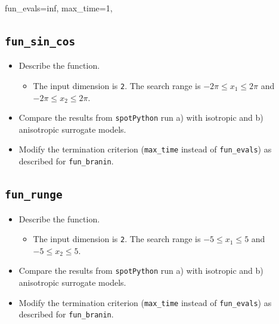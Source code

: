 \documentclass[
  letterpaper,
  DIV=11,
  numbers=noendperiod]{scrreprt}
\newenvironment{Shaded}{\begin{snugshade}}{\end{snugshade}}
\newcommand{\DecValTok}[1]{\textcolor[rgb]{0.68,0.00,0.00}{#1}}
\newcommand{\NormalTok}[1]{\textcolor[rgb]{0.00,0.23,0.31}{#1}}
\newcommand{\OperatorTok}[1]{\textcolor[rgb]{0.37,0.37,0.37}{#1}}
\providecommand{\tightlist}{%
  \setlength{\itemsep}{0pt}\setlength{\parskip}{0pt}}\usepackage{longtable,booktabs,array}
\begin{document}
\begin{Shaded}
\begin{Highlighting}[]
\NormalTok{fun\_evals}\OperatorTok{=}\NormalTok{inf,}
\NormalTok{max\_time}\OperatorTok{=}\DecValTok{1}\NormalTok{,}
\end{Highlighting}
\end{Shaded}

\subsection{\texorpdfstring{\texttt{fun\_sin\_cos}}{fun\_sin\_cos}}\label{fun_sin_cos}

\begin{itemize}
\tightlist
\item
  Describe the function.

  \begin{itemize}
  \tightlist
  \item
    The input dimension is \texttt{2}. The search range is
    \(-2\pi \leq x_1 \leq 2\pi\) and \(-2\pi \leq x_2 \leq 2\pi\).
  \end{itemize}
\item
  Compare the results from \texttt{spotPython} run a) with isotropic and
  b) anisotropic surrogate models.
\item
  Modify the termination criterion (\texttt{max\_time} instead of
  \texttt{fun\_evals}) as described for \texttt{fun\_branin}.
\end{itemize}

\subsection{\texorpdfstring{\texttt{fun\_runge}}{fun\_runge}}\label{fun_runge}

\begin{itemize}
\tightlist
\item
  Describe the function.

  \begin{itemize}
  \tightlist
  \item
    The input dimension is \texttt{2}. The search range is
    \(-5 \leq x_1 \leq 5\) and \(-5 \leq x_2 \leq 5\).
  \end{itemize}
\item
  Compare the results from \texttt{spotPython} run a) with isotropic and
  b) anisotropic surrogate models.
\item
  Modify the termination criterion (\texttt{max\_time} instead of
  \texttt{fun\_evals}) as described for \texttt{fun\_branin}.
\end{itemize}
\end{document}
